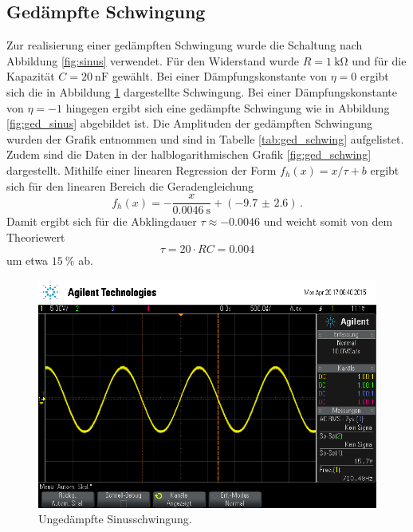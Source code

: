\subsection{Gedämpfte Schwingung} %
\label{sub:subsection_name}

Zur realisierung einer gedämpften Schwingung wurde die Schaltung nach Abbildung \ref{fig:sinus} verwendet.
Für den Widerstand wurde $R = \SI{1}{\kilo\ohm}$ und für die Kapazität $C = \SI{20}{\nano\farad}$ gewählt.
Bei einer Dämpfungskonstante von $\eta = 0$ ergibt sich die in Abbildung \ref{fig:unged_sinus} dargestellte Schwingung.
Bei einer Dämpfungskonstante von $\eta = -1$ hingegen ergibt sich eine gedämpfte Schwingung wie in Abbildung \ref{fig:ged_sinus} abgebildet ist.
Die Amplituden der gedämpften Schwingung wurden der Grafik entnommen und sind in Tabelle \ref{tab:ged_schwing} aufgelistet.
Zudem sind die Daten in der halblogarithmischen Grafik \ref{fig:ged_schwing} dargestellt.
Mithilfe einer linearen Regression der Form $f_{h}(x) = x / \tau + b$ ergibt sich für den linearen Bereich die Geradengleichung
\begin{equation*}
    f_h(x) = -\frac{x}{\SI{0.0046}{\second}} + (\num{-9.7(26)})\,.
\end{equation*}
Damit ergibt sich für die Abklingdauer $\tau \approx \num{-0.0046}$ und weicht somit von dem Theoriewert
\begin{equation*}
    \tau = 20 \cdot R C = 0.004
\end{equation*}
um etwa $\SI{15}{\percent}$ ab.

\begin{figure}[!h]
    \centering
    \includegraphics[width=0.8\linewidth]{data/scope_16.png}
    \caption{Ungedämpfte Sinusschwingung.}
    \label{fig:unged_sinus}
\end{figure}

